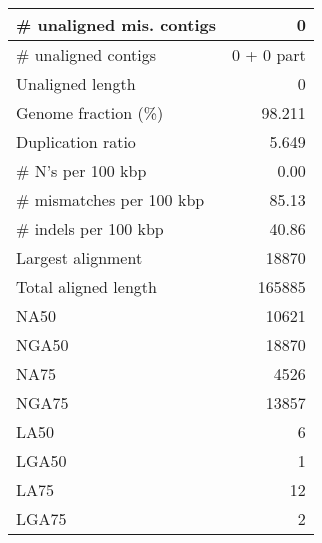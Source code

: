 \documentclass[12pt,a4paper]{article}
\begin{document}
\begin{table}[ht]
\begin{center}
\begin{tabular}{|l*{1}{|r}|}
\# unaligned mis. contigs & 0 \\ \hline
\# unaligned contigs & 0 + 0 part \\ \hline
Unaligned length & 0 \\ \hline
Genome fraction (\%) & 98.211 \\ \hline
Duplication ratio & 5.649 \\ \hline
\# N's per 100 kbp & 0.00 \\ \hline
\# mismatches per 100 kbp & 85.13 \\ \hline
\# indels per 100 kbp & 40.86 \\ \hline
Largest alignment & 18870 \\ \hline
Total aligned length & 165885 \\ \hline
NA50 & 10621 \\ \hline
NGA50 & 18870 \\ \hline
NA75 & 4526 \\ \hline
NGA75 & 13857 \\ \hline
LA50 & 6 \\ \hline
LGA50 & 1 \\ \hline
LA75 & 12 \\ \hline
LGA75 & 2 \\ \hline
\end{tabular}
\end{center}
\end{table}
\end{document}
